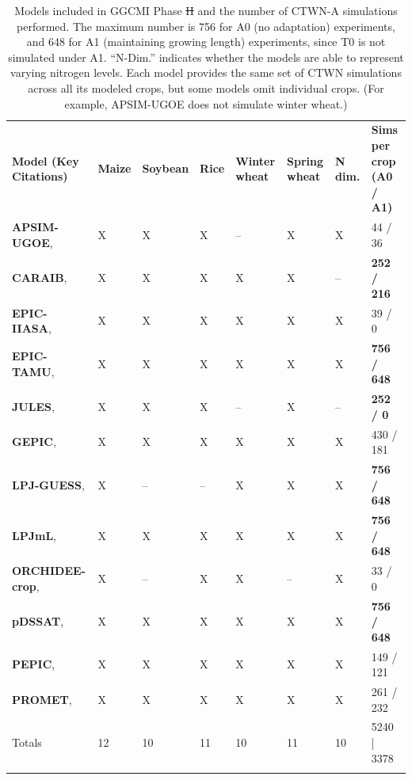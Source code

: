 \documentclass[gmd, manuscript]{copernicus} %
\providecommand{\DIFadd}[1]{{\protect\color{blue}\uwave{#1}}} %
\providecommand{\DIFdel}[1]{{\protect\color{red}\sout{#1}}}                      %
\providecommand{\DIFaddend}{} %
\providecommand{\DIFaddFL}[1]{\DIFadd{#1}} %
\providecommand{\DIFdelFL}[1]{\DIFdel{#1}} %
\providecommand{\DIFaddbeginFL}{} %
\providecommand{\DIFaddendFL}{} %
\providecommand{\DIFdelbeginFL}{} %
\providecommand{\DIFdelendFL}{} %
\begin{document}
\DIFaddend \begin{table}[t]
\caption{
Models included in GGCMI Phase \DIFdelbeginFL \DIFdelFL{II }\DIFdelendFL \DIFaddbeginFL \DIFaddFL{2 }\DIFaddendFL and the number of CTWN-A simulations performed. 
The maximum number is 756 for A0 (no adaptation) experiments, and 648 for A1 (maintaining growing length) experiments, since T0 is not simulated under A1. ``N-Dim.'' indicates whether the models are able to represent varying nitrogen levels.
Each model provides the same set of CTWN simulations across all its modeled crops, but some models omit individual crops. (For example, APSIM-UGOE does not simulate winter wheat.)
}
\label{table:models}
  \begin{tabular}{p{6cm} p{1cm} p{1cm} p{1cm} p{1cm} p{1cm} p{1cm} p{1.9cm}}
    \tophline
    {\textbf{Model (Key Citations)}}&{\textbf{Maize}}&{\textbf{Soybean}}&{\textbf{Rice}}&{\textbf{Winter wheat}}&{\textbf{Spring wheat}}&{\textbf{N dim.}}&{\textbf{Sims per crop (A0 / A1)}}\\ \middlehline
    {\textbf{APSIM-UGOE},    \citet{KEATING2003267, HOLZWORTH2014327}} & {X} & {X} & {X} & {--} & {X} & {X} & {44 / 36}\\ \middlehline
    {\textbf{CARAIB},        \citet{Dury2011, Pirttioja2015}}  & {X} & {X} & {X} & {X} & {X} & {--} & {\textbf{252 / 216}}\\ \middlehline
    {\textbf{EPIC-IIASA},    \citet{BALKOVIC2014}} & {X} & {X} & {X} & {X} & {X} & {X} & {39 / 0}\\  \middlehline
    {\textbf{EPIC-TAMU},     \citet{Izaurralde06}} & {X} & {X} & {X} & {X} & {X} & {X} & {\textbf{756 / 648}}\\ \middlehline
    {\textbf{JULES},         \citet{Osborne2015, Williams2015, Williams2017}} & {X} & {X} & {X} & {--} & {X} & {--} & {\textbf{252 / 0}}\\ \middlehline
    {\textbf{GEPIC},         \citet{LIU2007478, FOLBERTH201221}} & {X} & {X} & {X} & {X} & {X} & {X} & {430 / 181}\\ \middlehline
    {\textbf{LPJ-GUESS},     \citet{Lindeskog2013, Olin2015}} & {X} & {--} & {--} & {X} & {X} & {X} & {\textbf{756 / 648}}\\  \middlehline
    {\textbf{LPJmL},         \citet{von_Bloh_implementing_2018}} & {X} & {X} & {X} & {X} & {X} & {X} & {\textbf{756 / 648}}\\ \middlehline
    {\textbf{ORCHIDEE-crop}, \citet{Wu2016}} & {X} & {--}  & {X} & {X} & {--} & {X} & {33 / 0}\\ \middlehline
    {\textbf{pDSSAT},        \citet{Elliott2014b, JONES2003235}} & {X} & {X} & {X} & {X} & {X} & {X} & {\textbf{756 / 648}}\\ \middlehline
    {\textbf{PEPIC},         \citet{LIU2016164, LIU2016}}  & {X} & {X} & {X} & {X} & {X} & {X} & {149 / 121}\\ \middlehline
    {\textbf{PROMET},        \citet{Hank2015, MAUSER2015}} & {X} & {X} & {X} & {X} & {X} & {X} & {261 / 232}\\ \middlehline
    {Totals} & {12} & {10} & {11} & {10} & {11} & {10} & {5240 | 3378}\\
    \bottomhline
  \end{tabular}
\end{table}
\end{document}
